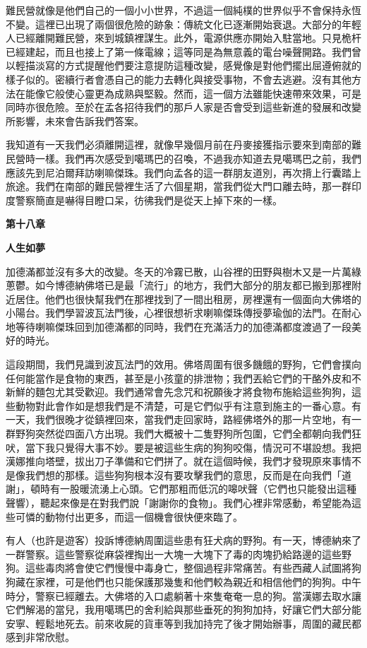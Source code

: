 難民營就像是他們自己的一個小小世界，不過這一個純樸的世界似乎不會保持永恆不變。這裡已出現了兩個很危險的跡象：傳統文化已逐漸開始衰退。大部分的年輕人已經離開難民營，來到城鎮裡謀生。此外，電源供應亦開始入駐當地。只見桅杆已經建起，而且也接上了第一條電線；這等同是為無意義的電台噪聲開路。我們曾以輕描淡寫的方式提醒他們要注意提防這種改變，感覺像是對他們擺出屈遵俯就的樣子似的。密續行者會憑自己的能力去轉化與接受事物，不會去逃避。沒有其他方法在能像它般使心靈更為成熟與堅毅。然而，這一個方法雖能快速帶來效果，可是同時亦很危險。至於在孟各招待我們的那戶人家是否會受到這些新進的發展和改變所影響，未來會告訴我們答案。

我知道有一天我們必須離開這裡，就像早幾個月前在丹麥接獲指示要來到南部的難民營時一樣。我們再次感受到噶瑪巴的召喚，不過我亦知道去見噶瑪巴之前，我們應該先到尼泊爾拜訪喇嘛傑珠。我們向孟各的這一群朋友道別，再次揹上行囊踏上旅途。我們在南部的難民營裡生活了六個星期，當我們從大門口離去時，那一群印度警察簡直是嚇得目瞪口呆，彷彿我們是從天上掉下來的一樣。

\textbf{第十八章}

\textbf{人生如夢}

加德滿都並沒有多大的改變。冬天的冷霧已散，山谷裡的田野與樹木又是一片萬綠蔥鬱。如今博德納佛塔已是最「流行」的地方，我們大部分的朋友都已搬到那裡附近居住。他們也很快幫我們在那裡找到了一間出租房，房裡還有一個面向大佛塔的小陽台。我們學習波瓦法門後，心裡很想祈求喇嘛傑珠傳授夢瑜伽的法門。在耐心地等待喇嘛傑珠回到加德滿都的同時，我們在充滿活力的加德滿都度渡過了一段美好的時光。

這段期間，我們見識到波瓦法門的效用。佛塔周圍有很多饑餓的野狗，它們會撲向任何能當作是食物的東西，甚至是小孩童的排泄物；我們丟給它們的干酪外皮和不新鮮的麵包尤其受歡迎。我們通常會先念咒和祝願後才將食物布施給這些狗狗，這些動物對此會作如是想我們是不清楚，可是它們似乎有注意到施主的一番心意。有一天，我們很晚才從鎮裡回來，當我們走回家時，路經佛塔外的那一片空地，有一群野狗突然從四面八方出現。我們大概被十二隻野狗所包圍，它們全都朝向我們狂吠，當下我只覺得大事不妙。要是被這些生病的狗狗咬傷，情況可不堪設想。我把漢娜推向塔壁，拔出刀子準備和它們拼了。就在這個時候，我們才發現原來事情不是像我們想的那樣。這些狗狗根本沒有要攻擊我們的意思，反而是在向我們「道謝」，頓時有一股暖流湧上心頭。它們那粗而低沉的嗥吠聲（它們也只能發出這種聲響），聽起來像是在對我們說「謝謝你的食物」。我們心裡非常感動，希望能為這些可憐的動物付出更多，而這一個機會很快便來臨了。

有人（也許是遊客）投訴博德納周圍這些患有狂犬病的野狗。有一天，博德納來了一群警察。這些警察從麻袋裡掏出一大塊一大塊下了毒的肉塊扔給路邊的這些野狗。這些毒肉將會使它們慢慢中毒身亡，整個過程非常痛苦。有些西藏人試圖將狗狗藏在家裡，可是他們也只能保護那幾隻和他們較為親近和相信他們的狗狗。中午時分，警察已經離去。大佛塔的入口處躺著十來隻奄奄一息的狗。當漢娜去取水讓它們解渴的當兒，我用噶瑪巴的舍利給與那些垂死的狗狗加持，好讓它們大部分能安寧、輕鬆地死去。前來收屍的貨車等到我加持完了後才開始辦事，周圍的藏民都感到非常欣慰。

